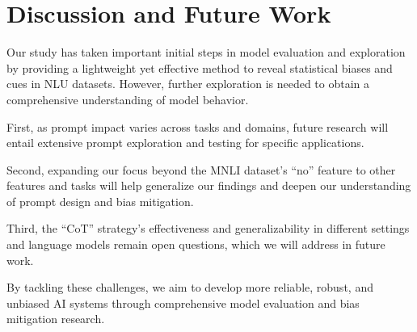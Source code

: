 \section{Discussion and Future Work}
\label{sec:discussion}
Our study has taken important initial steps in model 
evaluation and exploration by providing a lightweight yet 
effective method to reveal statistical biases and cues in NLU datasets. 
However, further exploration is needed to 
obtain a comprehensive understanding of model behavior.

First, as prompt impact varies across tasks and domains, 
future research will entail extensive prompt 
exploration and testing for specific applications.

Second, expanding our focus beyond the MNLI dataset's ``no''
feature to other features and tasks will help 
generalize our findings and deepen our 
understanding of prompt design and bias mitigation.

Third, the ``CoT'' strategy's effectiveness and generalizability 
in different settings and language models 
remain open questions, which we will address in future work.

By tackling these challenges, we aim to develop 
more reliable, robust, and unbiased AI systems 
through comprehensive model evaluation and bias mitigation research.

